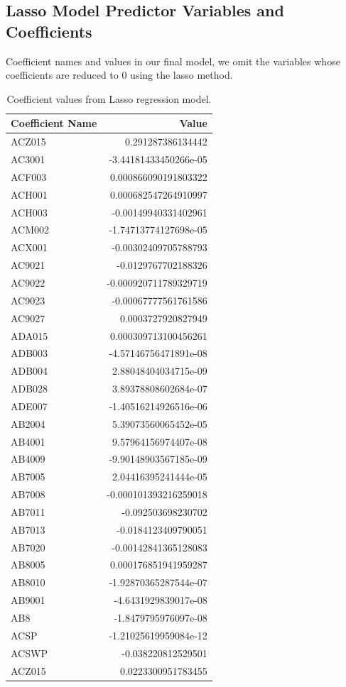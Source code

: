 \documentclass[a4paper,12pt]{article}
\begin{document}
\subsection{Lasso Model Predictor Variables and Coefficients}
Coefficient names and values in our final model, we omit the variables whose coefficients are reduced to 0 using the lasso method.       
\begin{table}[h]
\centering
\begin{tabular}{lr} %
\toprule
Coefficient Name & Value \\
\midrule
ACZ015 & 0.291287386134442 \\
AC3001 & -3.44181433450266e-05 \\
ACF003 & 0.000866090191803322 \\
ACH001 & 0.000682547264910997 \\
ACH003 & -0.00149940331402961 \\
ACM002 & -1.74713774127698e-05 \\
ACX001 & -0.00302409705788793 \\
AC9021 & -0.0129767702188326 \\
AC9022 & -0.000920711789329719 \\
AC9023 & -0.00067777561761586 \\
AC9027 & 0.0003727920827949 \\
ADA015 & 0.000309713100456261 \\
ADB003 & -4.57146756471891e-08 \\
ADB004 & 2.88048404034715e-09 \\
ADB028 & 3.89378808602684e-07 \\
ADE007 & -1.40516214926516e-06 \\
AB2004 & 5.39073560065452e-05 \\
AB4001 & 9.57964156974407e-08 \\
AB4009 & -9.90148903567185e-09 \\
AB7005 & 2.04416395241444e-05 \\
AB7008 & -0.000101393216259018 \\
AB7011 & -0.092503698230702 \\
AB7013 & -0.0184123409790051 \\
AB7020 & -0.00142841365128083 \\
AB8005 & 0.000176851941959287 \\
AB8010 & -1.92870365287544e-07 \\
AB9001 & -4.6431929839017e-08 \\
AB8 & -1.8479795976097e-08 \\
ACSP & -1.21025619959084e-12 \\
ACSWP & -0.038220812529501 \\
ACZ015 & 0.0223300951783455 \\
\bottomrule
\end{tabular}
\caption{Coefficient values from Lasso regression model.}
\label{tab:coefficients}
\end{table}
\end{document}
